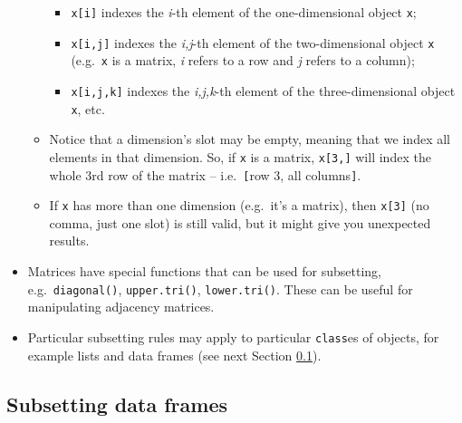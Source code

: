 \documentclass[
]{book}
\providecommand{\tightlist}{%
  \setlength{\itemsep}{0pt}\setlength{\parskip}{0pt}}
\begin{document}
\begin{itemize}
\begin{itemize}
    \begin{itemize}
    \tightlist
    \item
      \texttt{x{[}i{]}} indexes the \emph{i}-th element of the one-dimensional object \texttt{x};
    \item
      \texttt{x{[}i,j{]}} indexes the \emph{i,j}-th element of the two-dimensional object \texttt{x} (e.g.~\texttt{x} is a matrix, \emph{i} refers to a row and \emph{j} refers to a column);
    \item
      \texttt{x{[}i,j,k{]}} indexes the \emph{i,j,k}-th element of the three-dimensional object \texttt{x}, etc.
    \end{itemize}
  \item
    Notice that a dimension's slot may be empty, meaning that we index all elements in that dimension. So, if \texttt{x} is a matrix, \texttt{x{[}3,{]}} will index the whole 3rd row of the matrix -- i.e.~\texttt{{[}}row 3, all columns\texttt{{]}}.
  \item
    If \texttt{x} has more than one dimension (e.g.~it's a matrix), then \texttt{x{[}3{]}} (no comma, just one slot) is still valid, but it might give you unexpected results.
  \end{itemize}
\item
  Matrices have special functions that can be used for subsetting, e.g.~\texttt{diagonal()}, \texttt{upper.tri()}, \texttt{lower.tri()}. These can be useful for manipulating adjacency matrices.
\item
  Particular subsetting rules may apply to particular \texttt{class}es of objects, for example lists and data frames (see next Section \ref{index-df}).
\end{itemize}

\hypertarget{index-df}{%
\subsection{Subsetting data frames}\label{index-df}}
\end{document}

